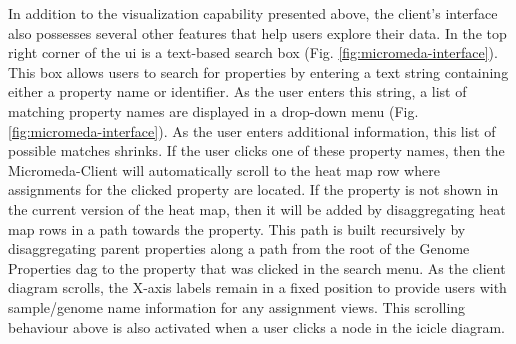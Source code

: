 In addition to the visualization capability presented above, the client's interface also possesses several other features that help users explore their data. In the top right corner of the \gls{ui} is a text-based search box (Fig. \ref{fig:micromeda-interface}). This box allows users to search for properties by entering a text string containing either a property name or identifier. As the user enters this string, a list of matching property names are displayed in a drop-down menu (Fig. \ref{fig:micromeda-interface}). As the user enters additional information, this list of possible matches shrinks. If the user clicks one of these property names, then the Micromeda-Client will automatically scroll to the heat map row where assignments for the clicked property are located. If the property is not shown in the current version of the heat map, then it will be added by disaggregating heat map rows in a path towards the property. This path is built recursively by disaggregating parent properties along a path from the root of the Genome Properties \gls{dag} to the property that was clicked in the search menu. As the client diagram scrolls, the X-axis labels remain in a fixed position to provide users with sample/genome name information for any assignment views. This scrolling behaviour above is also activated when a user clicks a node in the icicle diagram.

